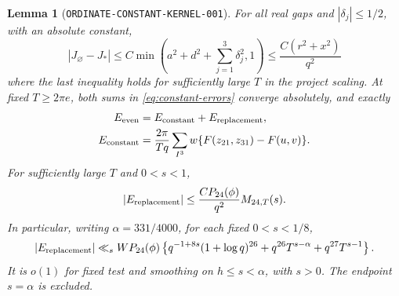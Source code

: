 \documentclass[11pt]{article}
\newtheorem{lemma}{Lemma}
\begin{document}
\begin{lemma}[\texttt{ORDINATE-CONSTANT-KERNEL-001}]
\label{lem:constant-kernel}
For all real gaps and $|\delta_j|\leq1/2$, with an absolute constant,
\begin{equation}\label{eq:constant-kernel-bound}
 |J_\varnothing-J_*|
 \leq C\min\left(a^2+d^2+\sum_{j=1}^3\delta_j^2,1\right)
 \leq \frac{C(r^2+x^2)}{q^2}
\end{equation}
where the last inequality holds for sufficiently large $T$ in the project
scaling. At fixed $T\geq2\pi e$, both sums in \eqref{eq:constant-errors}
converge absolutely, and exactly
\begin{align}
 E_{\rm even}&=E_{\rm constant}+E_{\rm replacement},
                                                   \label{eq:constant-split}\\
 E_{\rm constant}&=\frac{2\pi}{Tq}\sum_{I^3}w
                   \{F(z_{21},z_{31})-F(u,v)\}.\label{eq:constant-zero-sum}
\end{align}
For sufficiently large $T$ and $0<s<1$,
\begin{equation}\label{eq:constant-moment-bound}
 |E_{\rm replacement}|\leq \frac{CP_{24}(\phi)}{q^2}M_{24,T}(s).
\end{equation}
In particular, writing $\alpha=331/4000$, for each fixed $0<s<1/8$,
\begin{equation}\label{eq:constant-density-bound}
 |E_{\rm replacement}|\ll_s WP_{24}(\phi)
 \left\{q^{-1+8s}(1+\log q)^{26}
       +q^{26}T^{s-\alpha}+q^{27}T^{s-1}\right\}.
\end{equation}
It is $o(1)$ for fixed test and smoothing on $h\leq s<\alpha$,
with $s>0$. The endpoint $s=\alpha$ is excluded.
\end{lemma}
\end{document}
